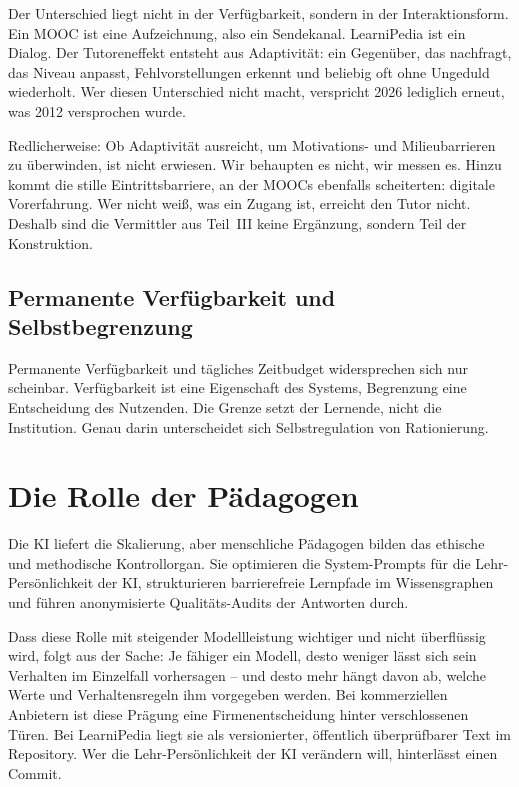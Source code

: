 \documentclass[11pt,a4paper]{article}
\begin{document}
Der Unterschied liegt nicht in der Verfügbarkeit, sondern in der Interaktionsform. Ein MOOC ist eine Aufzeichnung, also ein Sendekanal. LearniPedia ist ein Dialog. Der Tutoreneffekt entsteht aus Adaptivität: ein Gegenüber, das nachfragt, das Niveau anpasst, Fehlvorstellungen erkennt und beliebig oft ohne Ungeduld wiederholt. Wer diesen Unterschied nicht macht, verspricht 2026 lediglich erneut, was 2012 versprochen wurde.

Redlicherweise: Ob Adaptivität ausreicht, um Motivations- und Milieubarrieren zu überwinden, ist nicht erwiesen. Wir behaupten es nicht, wir messen es. Hinzu kommt die stille Eintrittsbarriere, an der MOOCs ebenfalls scheiterten: digitale Vorerfahrung. Wer nicht weiß, was ein Zugang ist, erreicht den Tutor nicht. Deshalb sind die Vermittler aus Teil~III keine Ergänzung, sondern Teil der Konstruktion.

\subsection{Permanente Verfügbarkeit und Selbstbegrenzung}
Permanente Verfügbarkeit und tägliches Zeitbudget widersprechen sich nur scheinbar. Verfügbarkeit ist eine Eigenschaft des Systems, Begrenzung eine Entscheidung des Nutzenden. Die Grenze setzt der Lernende, nicht die Institution. Genau darin unterscheidet sich Selbstregulation von Rationierung.

\section{Die Rolle der Pädagogen}
\label{sec:paedagogen}
Die KI liefert die Skalierung, aber menschliche Pädagogen bilden das ethische und methodische Kontrollorgan. Sie optimieren die System-Prompts für die Lehr-Persönlichkeit der KI, strukturieren barrierefreie Lernpfade im Wissensgraphen und führen anonymisierte Qualitäts-Audits der Antworten durch.

Dass diese Rolle mit steigender Modellleistung wichtiger und nicht überflüssig wird, folgt aus der Sache: Je fähiger ein Modell, desto weniger lässt sich sein Verhalten im Einzelfall vorhersagen -- und desto mehr hängt davon ab, welche Werte und Verhaltensregeln ihm vorgegeben werden. Bei kommerziellen Anbietern ist diese Prägung eine Firmenentscheidung hinter verschlossenen Türen. Bei LearniPedia liegt sie als versionierter, öffentlich überprüfbarer Text im Repository. Wer die Lehr-Persönlichkeit der KI verändern will, hinterlässt einen Commit.
\end{document}
